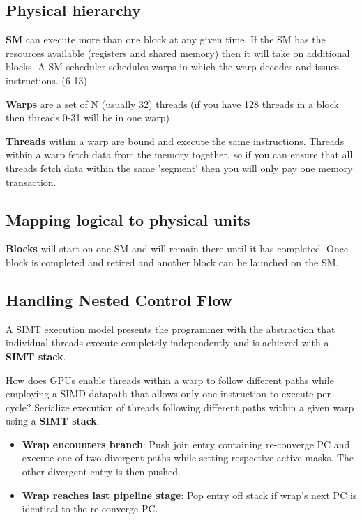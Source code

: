 \documentclass{article}
\begin{document}
\begin{multicols*}{2}
\subsection{Physical hierarchy}
\textbf{SM} can execute more than one block at any given time. If the SM has the resources available (registers and shared memory) then it will take on additional blocks. A SM scheduler schedules warps in which the warp decodes and issues instructions. (6-13)
\medskip\par\noindent
\textbf{Warps} are a set of N (usually 32) threads (if you have 128 threads in a block then threads 0-31 will be in one warp)
\medskip\par\noindent
\textbf{Threads} within a warp are bound and execute the same instructions. Threads within a warp fetch data from the memory together, so if you can ensure that all threads fetch data within the same 'segment' then you will only pay one memory transaction.

\subsection{Mapping logical to physical units}
\textbf{Blocks} will start on one SM and will remain there until it has completed. Once block is completed and retired and another block can be launched on the SM.

\subsection{Handling Nested Control Flow}
A SIMT execution model presents the programmer with the abstraction that individual threads execute completely independently and is achieved with a \textbf{SIMT stack}. 
\medskip\par\noindent
How does GPUs enable threads within a warp to follow different paths while employing a SIMD datapath that allows only one instruction to execute per cycle? Serialize execution of threads following different paths within a given warp using a \textbf{SIMT stack}.

\begin{itemize}
    \item \textbf{Wrap encounters branch}: Push join entry containing re-converge PC and execute one of two divergent paths while setting respective active masks. The other divergent entry is then pushed.
    \item \textbf{Wrap reaches last pipeline stage}: Pop entry off stack if wrap's next PC is identical to the re-converge PC.
\end{itemize}


\end{multicols*}
\end{document}
